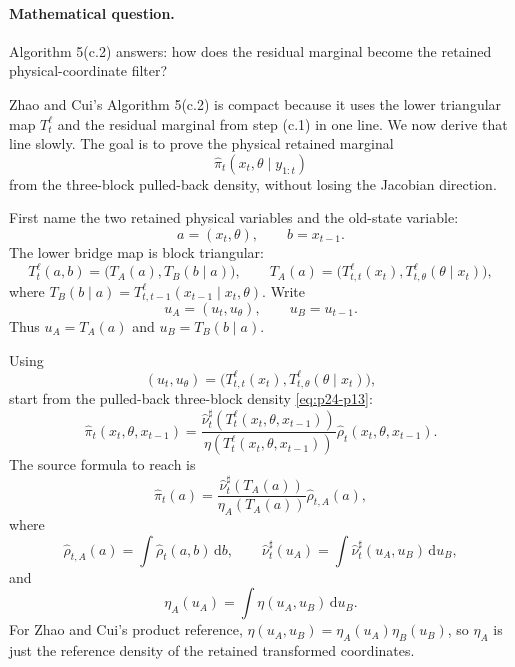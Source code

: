 \documentclass[11pt]{article}
\numberwithin{equation}{section}
\newcommand{\dd}{\,\mathrm d}
\begin{document}
\paragraph{Mathematical question.}
Algorithm 5(c.2) answers: how does the residual marginal become the retained
physical-coordinate filter?

Zhao and Cui's Algorithm 5(c.2) is compact because it uses the lower triangular
map \(T_t^\ell\) and the residual marginal from step (c.1) in one line.  We now
derive that line slowly.  The goal is to prove the physical retained marginal
\[
    \widehat\pi_t(x_t,\theta\mid y_{1:t})
\]
from the three-block pulled-back density, without losing the Jacobian direction.

First name the two retained physical variables and the old-state variable:
\begin{equation}
    a=(x_t,\theta),
    \qquad
    b=x_{t-1}.
    \label{eq:p30-c2-0}
\end{equation}
The lower bridge map is block triangular:
\begin{equation}
    T_t^\ell(a,b)
    =
    \bigl(T_A(a),T_B(b\mid a)\bigr),
    \qquad
    T_A(a)=
    \bigl(T_{t,t}^{\ell}(x_t),
    T_{t,\theta}^{\ell}(\theta\mid x_t)\bigr),
    \label{eq:p30-c2-1}
\end{equation}
where \(T_B(b\mid a)=T_{t,t-1}^{\ell}(x_{t-1}\mid x_t,\theta)\).  Write
\[
    u_A=(u_t,u_\theta),
    \qquad
    u_B=u_{t-1}.
\]
Thus \(u_A=T_A(a)\) and \(u_B=T_B(b\mid a)\).

Using
\begin{equation}
    (u_t,u_\theta)
    =
    \bigl(
    T_{t,t}^{\ell}(x_t),
    T_{t,\theta}^{\ell}(\theta\mid x_t)
    \bigr),
    \label{eq:p24-p16}
\end{equation}
start from the pulled-back three-block density \eqref{eq:p24-p13}:
\begin{equation}
    \widehat\pi_t(x_t,\theta,x_{t-1})
    =
    \frac{
    \widehat\nu_t^\sharp(T_t^\ell(x_t,\theta,x_{t-1}))}
    {\eta(T_t^\ell(x_t,\theta,x_{t-1}))}
    \widehat\rho_t(x_t,\theta,x_{t-1}).
    \label{eq:p24-p16a}
\end{equation}
The source formula to reach is
\begin{equation}
    \widehat\pi_t(a)
    =
    \frac{\widehat\nu_t^\sharp\!\left(T_A(a)\right)}
    {\eta_A\!\left(T_A(a)\right)}
    \widehat\rho_{t,A}(a),
    \label{eq:p30-c2-source-form}
\end{equation}
where
\begin{equation}
    \widehat\rho_{t,A}(a)=\int \widehat\rho_t(a,b)\dd b,
    \qquad
    \widehat\nu_t^\sharp(u_A)=
    \int \widehat\nu_t^\sharp(u_A,u_B)\dd u_B,
    \label{eq:p30-c2-2}
\end{equation}
and
\begin{equation}
    \eta_A(u_A)=\int \eta(u_A,u_B)\dd u_B.
    \label{eq:p30-c2-3}
\end{equation}
For Zhao and Cui's product reference,
\(\eta(u_A,u_B)=\eta_A(u_A)\eta_B(u_B)\), so \(\eta_A\) is just the
reference density of the retained transformed coordinates.
\end{document}
